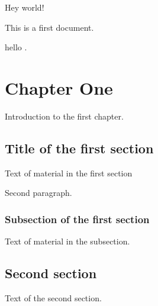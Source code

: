 \documentclass{book}
\begin{document}
Hey world!

This is a first document.

hello .

\chapter{Chapter One}
Introduction to the first chapter.


\section{Title of the first section}
Text of material in the first section

Second paragraph.

\subsection{Subsection of the first section}

Text of material in the subsection.


\section{Second section}

Text of the second section.
\end{document}
